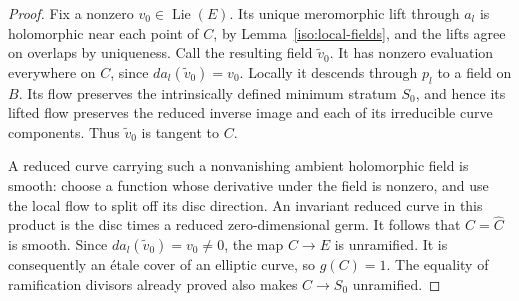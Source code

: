 \begin{proof}
Fix a nonzero \(v_0\in\operatorname{Lie}(E)\).
Its unique meromorphic lift through \(a_l\) is holomorphic near
each point of \(C\), by Lemma~\ref{iso:local-fields}, and the
lifts agree on overlaps by uniqueness.
Call the resulting field \(\widetilde v_0\).
It has nonzero evaluation everywhere on \(C\), since
\(da_l(\widetilde v_0)=v_0\).
Locally it descends through \(p_l\) to a field on \(B\).
Its flow preserves the intrinsically defined minimum stratum
\(S_0\), and hence its lifted flow preserves the reduced inverse
image and each of its irreducible curve components.
Thus \(\widetilde v_0\) is tangent to \(C\).

A reduced curve carrying such a nonvanishing ambient holomorphic
field is smooth: choose a function whose derivative under the
field is nonzero, and use the local flow to split off its disc
direction.  An invariant reduced curve in this product is the
disc times a reduced zero-dimensional germ.
It follows that \(C=\widehat C\) is smooth.
Since \(da_l(\widetilde v_0)=v_0\ne0\), the map \(C\to E\) is
unramified.  It is consequently an \'{e}tale cover of an elliptic
curve, so \(g(C)=1\).
The equality of ramification divisors already proved also makes
\(C\to S_0\) unramified.
\end{proof}

